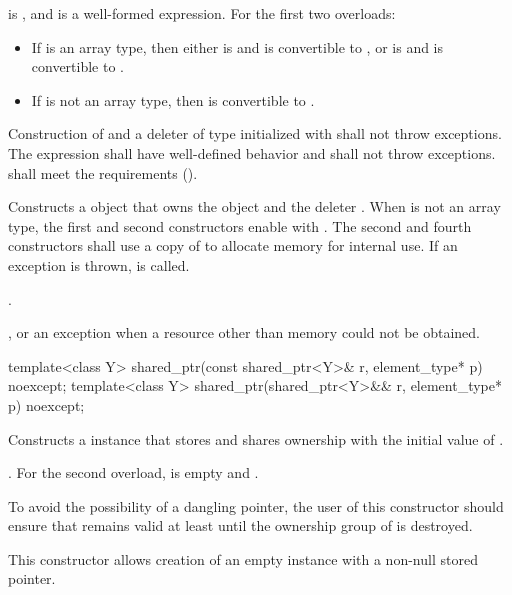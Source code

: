 \begin{itemdescr}
\pnum
\constraints
{} is , and
 is a well-formed expression.
For the first two overloads:

\begin{itemize}
\item
If  is an array type, then either
 is  and  is convertible to , or
 is  and  is convertible to .

\item
If  is not an array type, then  is convertible to .
\end{itemize}

\pnum
\expects
Construction of  and a deleter of type 
initialized with  shall not throw exceptions.
The expression 
shall have well-defined behavior and shall not throw exceptions.
 shall meet the  requirements
().

\pnum
\effects
Constructs a  object that owns the
object  and the deleter .
When  is not an array type,
the first and second constructors enable  with .
The second and fourth constructors shall use a copy of  to
allocate memory for internal use.
If an exception is thrown,  is called.

\pnum
\ensures
{}.

\pnum
\throws
{}, or an  exception
when a resource other than memory could not be obtained.
\end{itemdescr}

%
\begin{itemdecl}
template<class Y> shared_ptr(const shared_ptr<Y>& r, element_type* p) noexcept;
template<class Y> shared_ptr(shared_ptr<Y>&& r, element_type* p) noexcept;
\end{itemdecl}

\begin{itemdescr}
\pnum
\effects
Constructs a  instance that
stores  and shares ownership with
the initial value of .

\pnum
\ensures
{}.
For the second overload,
 is empty and .

\pnum
\begin{note}
To avoid the possibility of a dangling pointer, the
user of this constructor should ensure that  remains valid at
least until the ownership group of  is destroyed.
\end{note}

\pnum
\begin{note}
This constructor allows creation of an empty
 instance with a non-null stored pointer.
\end{note}
\end{itemdescr}

